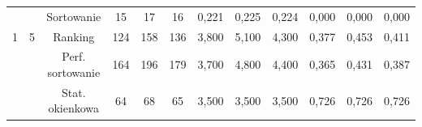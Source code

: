 \documentclass[magisterska]{pracamgr}
\begin{document}
\begin{table}[H]
{\begin{tabular}{@{}cccccccccccc@{}}
                                                               &                                                        & Sortowanie    & 15                                                     & 17                                                     & 16                                                        & 0,221                                                     & 0,225                                                      & 0,224                                                         & 0,000                                                              & 0,000                                                               & 0,000                                                                 \\
1                                                              & 5                                                      & Ranking    & 124                                                    & 158                                                    & 136                                                       & 3,800                                                     & 5,100                                                      & 4,300                                                         & 0,377                                                              & 0,453                                                               & 0,411                                                                 \\
                                                               &                                                        & Perf. sortowanie    & 164                                                    & 196                                                    & 179                                                       & 3,700                                                     & 4,800                                                      & 4,400                                                         & 0,365                                                              & 0,431                                                               & 0,387                                                                 \\
                                                               &                                                        & Stat. okienkowa    & 64                                                     & 68                                                     & 65                                                        & 3,500                                                     & 3,500                                                      & 3,500                                                         & 0,726                                                              & 0,726                                                               & 0,726                                                                 \\ \midrule

\end{tabular}}
\end{table}
\end{document}

